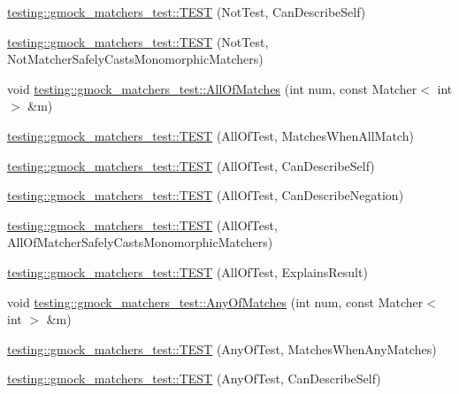 \begin{DoxyCompactItemize}
\item 
\hyperlink{namespacetesting_1_1gmock__matchers__test_a831db2bf90c3950953cdceaefebddd40}{testing\+::gmock\+\_\+matchers\+\_\+test\+::\+T\+E\+ST} (Not\+Test, Can\+Describe\+Self)
\item 
\hyperlink{namespacetesting_1_1gmock__matchers__test_a46849e0c019e331f830ed91137fa417a}{testing\+::gmock\+\_\+matchers\+\_\+test\+::\+T\+E\+ST} (Not\+Test, Not\+Matcher\+Safely\+Casts\+Monomorphic\+Matchers)
\item 
void \hyperlink{namespacetesting_1_1gmock__matchers__test_a51d8731c3824a6acdaa594645dd46779}{testing\+::gmock\+\_\+matchers\+\_\+test\+::\+All\+Of\+Matches} (int num, const Matcher$<$ int $>$ \&m)
\item 
\hyperlink{namespacetesting_1_1gmock__matchers__test_a7714d041eb2dd2e233db7f175fedef5a}{testing\+::gmock\+\_\+matchers\+\_\+test\+::\+T\+E\+ST} (All\+Of\+Test, Matches\+When\+All\+Match)
\item 
\hyperlink{namespacetesting_1_1gmock__matchers__test_a31056975d89eea2786997cf18b086bf4}{testing\+::gmock\+\_\+matchers\+\_\+test\+::\+T\+E\+ST} (All\+Of\+Test, Can\+Describe\+Self)
\item 
\hyperlink{namespacetesting_1_1gmock__matchers__test_a86c15b3bc163321c7a56aeb0b1709b87}{testing\+::gmock\+\_\+matchers\+\_\+test\+::\+T\+E\+ST} (All\+Of\+Test, Can\+Describe\+Negation)
\item 
\hyperlink{namespacetesting_1_1gmock__matchers__test_a4196a4000390e2378954d55b4f6d2893}{testing\+::gmock\+\_\+matchers\+\_\+test\+::\+T\+E\+ST} (All\+Of\+Test, All\+Of\+Matcher\+Safely\+Casts\+Monomorphic\+Matchers)
\item 
\hyperlink{namespacetesting_1_1gmock__matchers__test_a2b9f4a791dd4f1fb9f8a1400883a5db4}{testing\+::gmock\+\_\+matchers\+\_\+test\+::\+T\+E\+ST} (All\+Of\+Test, Explains\+Result)
\item 
void \hyperlink{namespacetesting_1_1gmock__matchers__test_aa4e9deb0a98413e62516451e7c060c7a}{testing\+::gmock\+\_\+matchers\+\_\+test\+::\+Any\+Of\+Matches} (int num, const Matcher$<$ int $>$ \&m)
\item 
\hyperlink{namespacetesting_1_1gmock__matchers__test_a4949d40a1ac77182274189c21848af00}{testing\+::gmock\+\_\+matchers\+\_\+test\+::\+T\+E\+ST} (Any\+Of\+Test, Matches\+When\+Any\+Matches)
\item 
\hyperlink{namespacetesting_1_1gmock__matchers__test_a00bd490bf974b3f3485a1b0fde9fa490}{testing\+::gmock\+\_\+matchers\+\_\+test\+::\+T\+E\+ST} (Any\+Of\+Test, Can\+Describe\+Self)

\end{DoxyCompactItemize}
